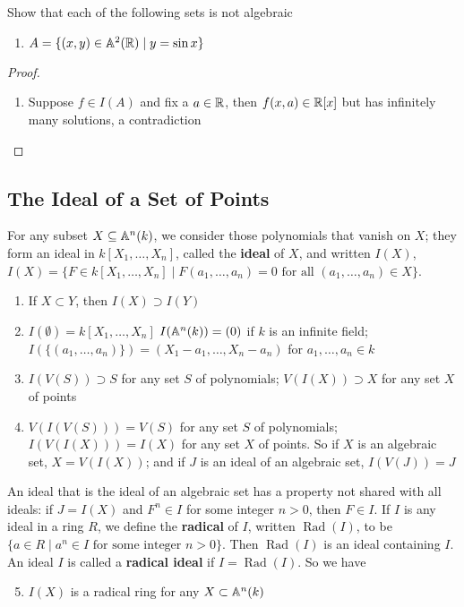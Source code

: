 \documentclass[11pt]{article}
\DeclareMathOperator{\Rad}{\text{Rad}}
\begin{document}
\begin{exercise}
\label{ex1.13}
Show that each of the following sets is not algebraic
\begin{enumerate}
\item \(A=\{(x,y)\in\mathbb{A}^2(\mathbb{R})\mid y=\sin x\}\)
\end{enumerate}
\end{exercise}

\begin{proof}
\begin{enumerate}
\item Suppose \(f\in I(A)\) and fix a \(a\in\mathbb{R}\), then \(f(x,a)\in\mathbb{R}[x]\) but has infinitely many
solutions, a contradiction
\end{enumerate}
\end{proof}
\subsection{The Ideal of a Set of Points}
\label{sec:org59a5c74}
For any subset \(X\subseteq\mathbb{A}^n(k)\), we consider those polynomials that vanish on \(X\); they form an
ideal in \(k[X_1,\dots,X_n]\), called the \textbf{ideal} of \(X\), and
written \(I(X)\), \(I(X)=\{F\in k[X_1,\dots,X_n]\mid F(a_1,\dots,a_n)=0\text{ for all }(a_1,\dots,a_n)\in X\}\).
\begin{enumerate}
\item If \(X\subset Y\), then \(I(X)\supset I(Y)\)
\item \(I(\emptyset)=k[X_1,\dots,X_n]\) \(I(\mathbb{A}^n(k))=(0)\) if \(k\) is an infinite
field; \(I(\{(a_1,\dots,a_n)\})=(X_1-a_1,\dots,X_n-a_n)\) for \(a_1,\dots,a_n\in k\)
\item \(I(V(S))\supset S\) for any set \(S\) of polynomials; \(V(I(X))\supset X\) for any set \(X\) of points
\item \(V(I(V(S)))=V(S)\) for any set \(S\) of polynomials; \(I(V(I(X)))=I(X)\) for any set \(X\)
of points. So if \(X\) is an algebraic set, \(X=V(I(X))\); and if \(J\) is an ideal of an
algebraic set, \(I(V(J))=J\)
\end{enumerate}


An ideal that is the ideal of an algebraic set has a property not shared with all ideals:
if \(J=I(X)\) and \(F^n\in I\) for some integer \(n>0\), then \(F\in I\). If \(I\) is any ideal in a
ring \(R\), we define the \textbf{radical} of \(I\), written \(\Rad(I)\), to
be \(\{a\in R\mid a^n\in I\text{ for some integer }n>0\}\). Then \(\Rad(I)\) is an ideal containing \(I\).
An ideal \(I\) is called a \textbf{radical ideal} if \(I=\Rad(I)\). So we have
\begin{enumerate}
\setcounter{enumi}{4}
\item \(I(X)\) is a radical ring for any \(X\subset\mathbb{A}^n(k)\)
\end{enumerate}
\end{document}

